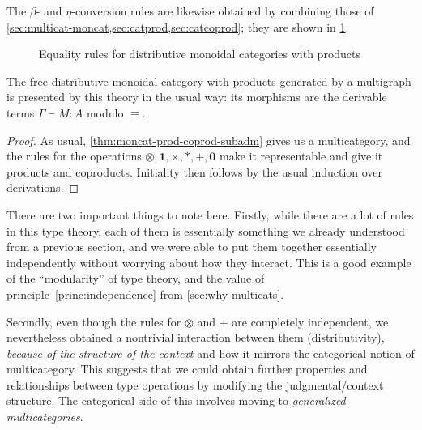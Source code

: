 \documentclass{book}
\let\types\vdash
\def\ttt{\mathord{\ast}}%
\def\pair#1#2{\langle #1,#2\rangle}
\def\inl{\mathsf{inl}}
\def\inr{\mathsf{inr}}
\def\case{\mathsf{match}_+}
\def\match{\mathsf{match}}
\def\zero{\mathbf{0}}
\def\abort{\match_{\zero}}
\def\one{\mathbf{1}}
\def\ott{\mathord{\star}}%
\let\tensor\otimes
\def\tpair#1#2{\text{\textlquill} #1,#2 \text{\textrquill}}%
\begin{document}
The $\beta$- and $\eta$-conversion rules are likewise obtained by combining those of \cref{sec:multicat-moncat,sec:catprod,sec:catcoprod}; they are shown in \cref{fig:moncat-prod-coprod-equiv}.

\begin{figure}
  \centering
  \caption{Equality rules for distributive monoidal categories with products}
  \label{fig:moncat-prod-coprod-equiv}
\end{figure}

\begin{thm}\label{thm:moncat-prod-coprod-initial}
  The free distributive monoidal category with products generated by a multigraph \cG is presented by this theory in the usual way: its morphisms are the derivable terms $\Gamma\types M:A$ modulo $\equiv$.
\end{thm}
\begin{proof}
  As usual, \cref{thm:moncat-prod-coprod-subadm} gives us a multicategory, and the rules for the operations $\tensor,\one,\times,\ttt,+,\zero$ make it representable and give it products and coproducts.
  Initiality then follows by the usual induction over derivations.
\end{proof}

There are two important things to note here.
Firstly, while there are a lot of rules in this type theory, each of them is essentially something we already understood from a previous section, and we were able to put them together essentially independently without worrying about how they interact.
This is a good example of the ``modularity'' of type theory, and the value of principle~\eqref{princ:independence} from \cref{sec:why-multicats}.

Secondly, even though the rules for $\tensor$ and $+$ are completely independent, we nevertheless obtained a nontrivial interaction between them (distributivity), \emph{because of the structure of the context} and how it mirrors the categorical notion of multicategory.
This suggests that we could obtain further properties and relationships between type operations by modifying the judgmental/context structure.
The categorical side of this involves moving to \emph{generalized multicategories}.
\end{document}
